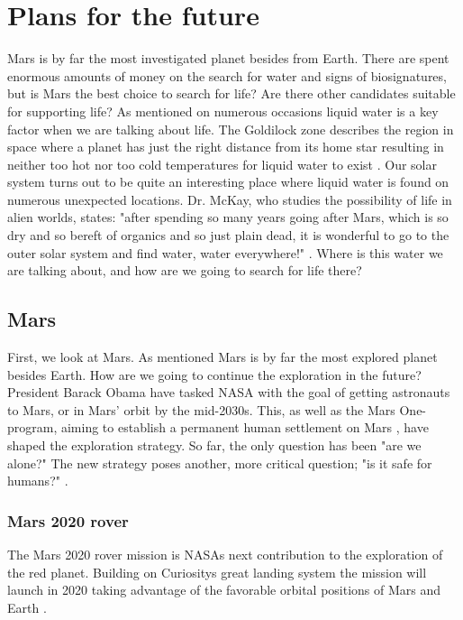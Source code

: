 \section*{Plans for the future}

Mars is by far the most investigated planet besides from Earth. 
There are spent enormous amounts of money on the search for water and signs of biosignatures, but is Mars the best choice to search for life? 
Are there other candidates suitable for supporting life? 
As mentioned on numerous occasions liquid water is a key factor when we are talking about life. 
The Goldilock zone describes the region in space where a planet has just the right distance from its home star resulting in neither too hot nor too cold temperatures for liquid water to exist \cite{FPlan26}. 
Our solar system turns out to be quite an interesting place where liquid water is found on numerous unexpected locations. 
Dr. McKay, who studies the possibility of life in alien worlds, states: "after spending so many years going after Mars, which is so dry and so bereft of organics and so just plain dead, it is wonderful to go to the outer solar system and find water, water everywhere!" \cite{FPlan09}.
Where is this water we are talking about, and how are we going to search for life there?
 
\subsection*{Mars}

First, we look at Mars. 
As mentioned Mars is by far the most explored planet besides Earth. 
How are we going to continue the exploration in the future?
President Barack Obama have tasked NASA with the goal of getting astronauts to Mars, or in Mars' orbit by the mid-2030s. 
This, as well as the Mars One-program, aiming to establish a permanent human settlement on Mars \cite{FPlan12}, have shaped the exploration strategy. 
So far, the only question has been "are we alone?" 
The new strategy poses another, more critical question; "is it safe for humans?" \cite{FPlan01}.

\subsubsection*{Mars 2020 rover}

The Mars 2020 rover mission is NASAs next contribution to the exploration of the red planet. 
Building on Curiositys great landing system the mission will launch in 2020 taking advantage of the favorable orbital positions of Mars and Earth \cite{FPlan14}. 

